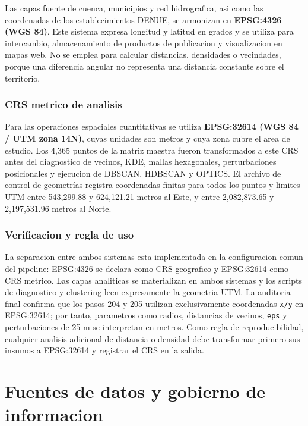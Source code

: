 \documentclass[11pt,letterpaper]{article}
\begin{document}
Las capas fuente de cuenca, municipios y red hidrografica, asi como las coordenadas de los establecimientos DENUE, se armonizan en \textbf{EPSG:4326 (WGS 84)}. Este sistema expresa longitud y latitud en grados y se utiliza para intercambio, almacenamiento de productos de publicacion y visualizacion en mapas web. No se emplea para calcular distancias, densidades o vecindades, porque una diferencia angular no representa una distancia constante sobre el territorio.

\subsubsection*{CRS metrico de analisis}

Para las operaciones espaciales cuantitativas se utiliza \textbf{EPSG:32614 (WGS 84 / UTM zona 14N)}, cuyas unidades son metros y cuya zona cubre el area de estudio. Los 4,365 puntos de la matriz maestra fueron transformados a este CRS antes del diagnostico de vecinos, KDE, mallas hexagonales, perturbaciones posicionales y ejecucion de DBSCAN, HDBSCAN y OPTICS. El archivo de control de geometrías registra coordenadas finitas para todos los puntos y limites UTM entre 543,299.88 y 624,121.21 metros al Este, y entre 2,082,873.65 y 2,197,531.96 metros al Norte.

\subsubsection*{Verificacion y regla de uso}

La separacion entre ambos sistemas esta implementada en la configuracion comun del pipeline: EPSG:4326 se declara como CRS geografico y EPSG:32614 como CRS metrico. Las capas analiticas se materializan en ambos sistemas y los scripts de diagnostico y clustering leen expresamente la geometria UTM. La auditoria final confirma que los pasos 204 y 205 utilizan exclusivamente coordenadas \texttt{x/y} en EPSG:32614; por tanto, parametros como radios, distancias de vecinos, \texttt{eps} y perturbaciones de 25 m se interpretan en metros. Como regla de reproducibilidad, cualquier analisis adicional de distancia o densidad debe transformar primero sus insumos a EPSG:32614 y registrar el CRS en la salida.

\section{Fuentes de datos y gobierno de informacion}
\end{document}
